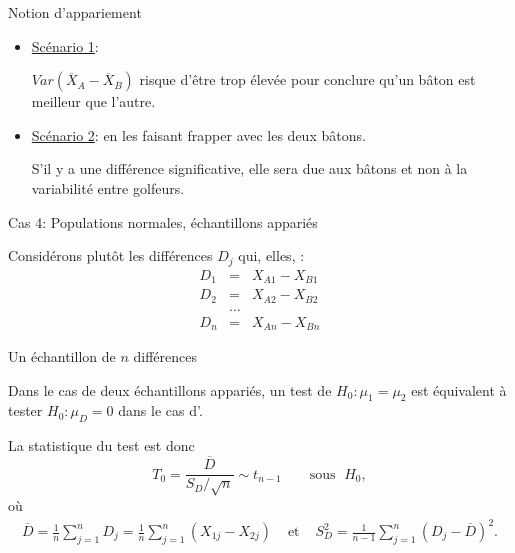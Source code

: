 \documentclass{BeamerTemplate}
\begin{document}
\begin{frame}[t]{Notion d'appariement}

\begin{itemize}
\item \underline{Scénario 1}:  %

\medskip
$Var(\overline{X}_A-\overline{X}_B)$ risque d'être trop élevée pour  conclure qu'un bâton est meilleur que l'autre.

\medskip
\item \underline{Scénario 2}:  en les faisant frapper avec les deux bâtons.

\medskip
S'il y a une différence significative, elle sera due aux bâtons et non à la variabilité entre golfeurs.

\medskip
{}
\end{itemize}
\end{frame}

\begin{frame}[t]{Cas 4: Populations normales, échantillons appariés}

Considérons plutôt les différences $D_j$ qui, elles, :
 $$\begin{array}{lll}
 D_1 &=& X_{A1}-X_{B1}\\
 D_2 &=& X_{A2}-X_{B2}\\
 &...&\\
 D_n &=& X_{An} - X_{Bn}
 \end{array}$$


\medskip

\end{frame}

\begin{frame}[t]{Un échantillon de $n$ différences}

{\small

Dans le cas de deux échantillons appariés, un test de $H_0: \mu_1 = \mu_2$ est équivalent à tester $H_0: \mu_D = 0$ dans le cas d'.

\bigskip
La statistique du test est donc
$$
T_0 = \frac{\overline{D}}{S_D / \sqrt{n}}\sim t_{n-1}\qquad\text{sous }\;H_0,
$$
o\`u
\begin{align*}
\overline{D} = \frac{1}{n} \sum_{j=1}^n D_j = \frac{1}{n} \sum_{j=1}^n (X_{1j} - X_{2j}) & \mbox{ et } & S_D^2 = \frac{1}{n-1} \sum_{j=1}^n (D_j - \overline{D})^2.
\end{align*}

\medskip
{}
}
\end{frame}
\end{document}
